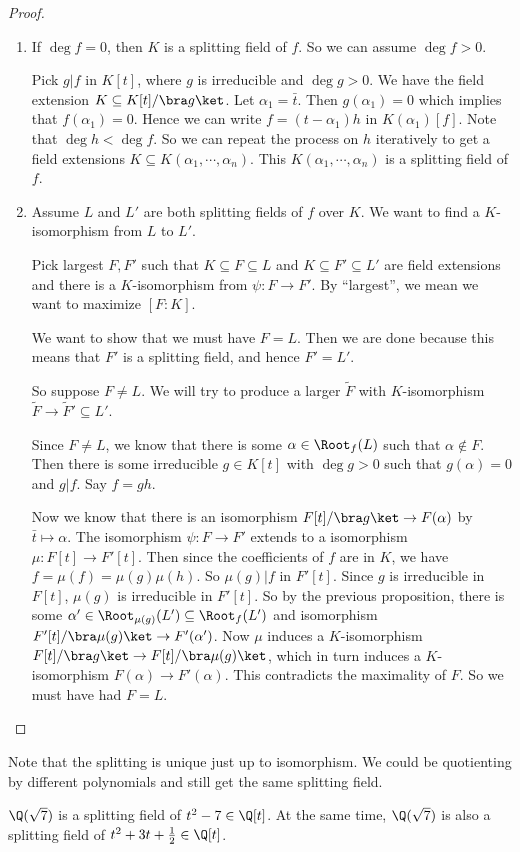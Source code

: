 \documentclass[a4paper]{article}
\begin{document}
\begin{proof}\leavevmode
  \begin{enumerate}
    \item If $\deg f = 0$, then $K$ is a splitting field of $f$. So we can assume $\deg f > 0$.

      Pick $g | f$ in $K[t]$, where $g$ is irreducible and $\deg g > 0$. We have the field extension $K\subseteq K[t]/\bra g\ket$. Let $\alpha_1 = \bar t$. Then $g(\alpha_1) = 0$ which implies that $f(\alpha_1) = 0$. Hence we can write $f = (t - \alpha_1) h$ in $K(\alpha_1)[f]$. Note that $\deg h < \deg f$. So we can repeat the process on $h$ iteratively to get a field extensions $K\subseteq K(\alpha_1, \cdots, \alpha_n)$. This $K(\alpha_1, \cdots, \alpha_n)$ is a splitting field of $f$.

    \item Assume $L$ and $L'$ are both splitting fields of $f$ over $K$. We want to find a $K$-isomorphism from $L$ to $L'$.

      Pick largest $F, F'$ such that $K \subseteq F\subseteq L$ and $K\subseteq F' \subseteq L'$ are field extensions and there is a $K$-isomorphism from $\psi: F \to F'$. By ``largest'', we mean we want to maximize $[F:K]$.

      We want to show that we must have $F = L$. Then we are done because this means that $F'$ is a splitting field, and hence $F' = L'$.

      So suppose $F\not= L$. We will try to produce a larger $\tilde{F}$ with $K$-isomorphism $\tilde{F} \to \tilde{F}' \subseteq L'$.

      Since $F\not= L$, we know that there is some $\alpha \in \Root_f(L)$ such that $\alpha\not\in F$. Then there is some irreducible $g\in K[t]$ with $\deg g > 0$ such that $g(\alpha) = 0$ and $g | f$. Say $f = gh$.

      Now we know that there is an isomorphism $F[t]/\bra g\ket \to F(\alpha)$ by $\bar t \mapsto \alpha$. The isomorphism $\psi: F \to F'$ extends to a isomorphism $\mu: F[t] \to F'[t]$. Then since the coefficients of $f$ are in $K$, we have  $f = \mu(f) = \mu(g)\mu(h)$.  So $\mu(g) | f$ in $F'[t]$. Since $g$ is irreducible in $F[t]$, $\mu(g)$ is irreducible in $F'[t]$. So by the previous proposition, there is some $\alpha' \in \Root_{\mu(g)}(L') \subseteq \Root_f(L')$ and isomorphism $F'[t]/\bra \mu(g)\ket \to F'(\alpha')$.
      Now $\mu$ induces a $K$-isomorphism $F[t]/\bra g\ket \to F[t]/\bra \mu(g)\ket$, which in turn induces a $K$-isomorphism $F(\alpha) \to F'(\alpha)$. This contradicts the maximality of $F$. So we must have had $F = L$.
  \end{enumerate}
\end{proof}
Note that the splitting is unique just up to isomorphism. We could be quotienting by different polynomials and still get the same splitting field.
\begin{eg}
  $\Q(\sqrt{7})$ is a splitting field of $t^2 - 7\in \Q[t]$. At the same time, $\Q(\sqrt{7})$ is also a splitting field of $t^2 + 3t + \frac{1}{2} \in \Q[t]$.
\end{eg}
\end{document}
